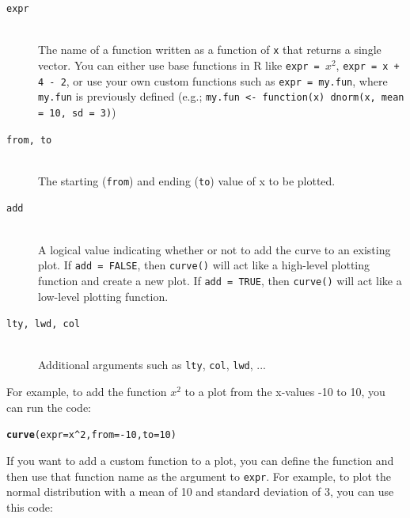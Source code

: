 \documentclass{tufte-book}\usepackage[]{graphicx}\usepackage[]{color}
\makeatletter
\newcommand{\hlnum}[1]{\textcolor[rgb]{0.686,0.059,0.569}{#1}}%
\newcommand{\hlopt}[1]{\textcolor[rgb]{0,0,0}{#1}}%
\newcommand{\hlstd}[1]{\textcolor[rgb]{0.345,0.345,0.345}{#1}}%
\newcommand{\hlkwc}[1]{\textcolor[rgb]{0.333,0.667,0.333}{#1}}%
\newcommand{\hlkwd}[1]{\textcolor[rgb]{0.737,0.353,0.396}{\textbf{#1}}}%
\newenvironment{kframe}{%
 \def\at@end@of@kframe{}%
 \ifinner\ifhmode%
  \def\at@end@of@kframe{\end{minipage}}%
  \begin{minipage}{\columnwidth}%
 \fi\fi%
 \def\FrameCommand##1{\hskip\@totalleftmargin \hskip-\fboxsep
 \colorbox{shadecolor}{##1}\hskip-\fboxsep
     \hskip-\linewidth \hskip-\@totalleftmargin \hskip\columnwidth}%
 \MakeFramed {\advance\hsize-\width
   \@totalleftmargin\z@ \linewidth\hsize
   \@setminipage}}%
 {\par\unskip\endMakeFramed%
 \at@end@of@kframe}
\newenvironment{knitrout}{}{} %
\makeatother
\begin{document}
\begin{footnotesize}
{{\begin{description}

\item[\tt{expr}] \hfill \\
 The name of a function written as a function of \texttt{x} that returns a single vector. You can either use base functions in R like \texttt{expr = $x^2$}, \texttt{expr = x + 4 - 2}, or use your own custom functions such as \texttt{expr = my.fun}, where \texttt{my.fun} is previously defined (e.g.; \texttt{my.fun <- function(x) {dnorm(x, mean = 10, sd = 3)}})

\item[\tt{from, to}] \hfill \\
 The starting (\texttt{from}) and ending (\texttt{to}) value of x to be plotted.

\item[\tt{add}] \hfill \\
 A logical value indicating whether or not to add the curve to an existing plot. If \texttt{add = FALSE}, then \texttt{curve()} will act like a high-level plotting function and create a new plot. If \texttt{add = TRUE}, then \texttt{curve()} will act like a low-level plotting function.

\item[\tt{lty, lwd, col}] \hfill \\
Additional arguments such as \texttt{lty}, \texttt{col}, \texttt{lwd}, ...

\end{description}

}
}
\vspace{5mm} %

For example, to add the function $x^2$ to a plot from the x-values -10 to 10, you can run the code:

\begin{knitrout}
\color{fgcolor}\begin{kframe}
\begin{alltt}
\hlkwd{curve}\hlstd{(}\hlkwc{expr} \hlstd{= x}\hlopt{^}\hlnum{2}\hlstd{,} \hlkwc{from} \hlstd{=} \hlopt{-}\hlnum{10}\hlstd{,} \hlkwc{to} \hlstd{=} \hlnum{10}\hlstd{)}
\end{alltt}
\end{kframe}
\end{knitrout}

If you want to add a custom function to a plot, you can define the function and then use that function name as the argument to \texttt{expr}. For example, to plot the normal distribution with a mean of 10 and standard deviation of 3, you can use this code:


\end{footnotesize}
\end{document}
